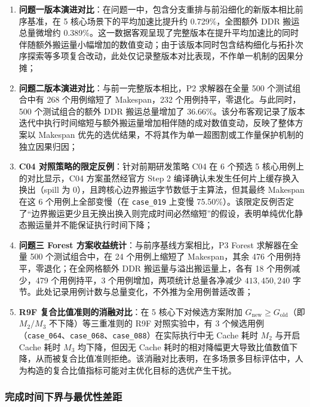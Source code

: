 \documentclass[anonymous,withtoc]{gmcm2026}
\providecommand{\tightlist}{\setlength{\itemsep}{0pt}\setlength{\parskip}{0pt}}
\begin{document}
\begin{enumerate}
\def\labelenumi{\arabic{enumi}.}
\tightlist
\item
  \textbf{问题一版本演进对比}：在问题一中，包含分支重排与前沿细化的新版本相比前序基准，在 5 核心场景下的平均加速比提升约 0.729\%，全图额外 DDR 搬运总量微增约 0.389\%。这一数据客观呈现了完整版本在提升平均加速比的同时伴随额外搬运量小幅增加的数值变动；由于该版本同时包含结构细化与拓扑次序探索等多项复合改动，此处仅记录整版本对比表现，不作单一机制的因果分摊；
\item
  \textbf{问题二版本演进对比}：与前一完整版本相比，P2 求解器在全量 500 个测试组合中有 268 个用例缩短了 Makespan，232 个用例持平，零退化。与此同时，500 个测试组合的额外 DDR 搬运总量增加了 36.66\%。该分布客观记录了版本迭代中执行时间缩短与额外搬运量增加相伴随的成对数值变动，反映了整体方案以 Makespan 优先的选优结果，不将其作为单一超图割或工作量保护机制的独立因果归因；
\item
  \textbf{C04 对照策略的限定反例}：针对前期研发策略 C04 在 6 个预选 5 核心用例上的对比显示，C04 方案虽然经官方 Step 2 编译确认未发生任何片上缓存换入换出（spill 为 0），且跨核心边界搬运字节数低于主算法，但其最终 Makespan 在这 6 个用例上全部变慢（在 \texttt{case\_019} 上变慢 75.50\%）。该限定反例否定了``边界搬运更少且无换出换入则完成时间必然缩短''的假设，表明单纯优化静态搬运量并不能保证执行时间下降；
\item
  \textbf{问题三 Forest 方案收益统计}：与前序基线方案相比，P3 Forest 求解器在全量 500 个测试组合中，在 24 个用例上缩短了 Makespan，其余 476 个用例持平，零退化；在全网格额外 DDR 搬运量与溢出搬运量上，各有 18 个用例减少，479 个用例持平，3 个用例增加，两项统计总量各净减少 \(413{,}450{,}240\) 字节。此处记录用例计数与总量变化，不外推为全用例普适改善；
\item
  \textbf{R9F 复合比值准则的消融对比}：在 5 核心下对候选方案附加 \(G_{\mathrm{new}} \ge G_{\mathrm{old}}\)（即 \(M_2/M_3\) 不下降）等三重准则的 R9F 对照实验中，有 3 个候选用例（\texttt{case\_064}、\texttt{case\_068}、\texttt{case\_088}）在实际执行中无 Cache 耗时 \(M_2\) 与开启 Cache 耗时 \(M_3\) 均下降，但因无 Cache 耗时的相对降幅更大导致比值数值下降，从而被复合比值准则拒绝。该消融对比表明，在多场景多目标评估中，人为构造的复合比值指标可能对主优化目标的选优产生干扰。
\end{enumerate}

\subsubsection{完成时间下界与最优性差距}
\end{document}
